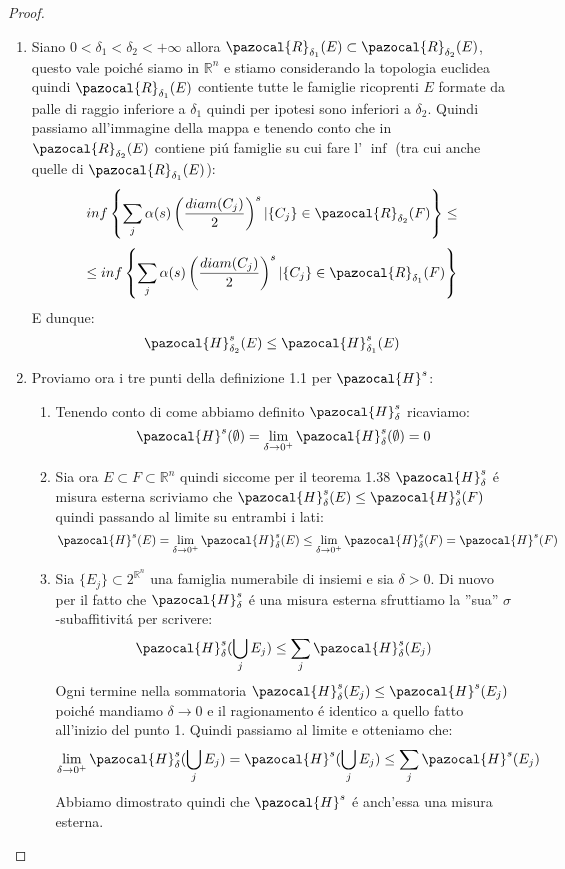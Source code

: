 \documentclass[11pt,a4paper]{report}
\theoremstyle{plain}
\theoremstyle{definition}
\newcommand{\Ha}{\pazocal{H}_\delta}
\newcommand{\Hu}{\pazocal{H}}
\begin{document}
\begin{proof}
	\begin{enumerate}
		\item Siano $0 < \delta_1 < \delta_2 < + \infty$ allora $\pazocal{R}_{\delta_1}(E) \subset \pazocal{R}_{\delta_2}(E)$, questo vale poich\'e siamo in $\mathbb{R}^n$ e stiamo considerando la topologia euclidea quindi $\pazocal{R}_{\delta_1}(E)$ contiente tutte le famiglie ricoprenti $E$ formate da palle di raggio inferiore a $\delta_1$ quindi per ipotesi sono inferiori a $\delta_2$. Quindi passiamo all'immagine della mappa e tenendo conto che in $\pazocal{R}_{\delta_2}(E)$ contiene pi\'u famiglie su cui fare l' $\inf$ (tra cui anche quelle di $\pazocal{R}_{\delta_1}(E)$):
		\[
			inf\left\{\sum\limits_j \alpha(s) \left(\frac{diam(C_j)}{2}\right)^s | \{C_j\} \in  \pazocal{R}_{\delta_2}(F)\right\} \le
		\] 
		\[
			\le inf\left\{\sum\limits_j \alpha(s) \left(\frac{diam(C_j)}{2}\right)^s | \{C_j\} \in  \pazocal{R}_{\delta_1}(F)\right\}		
		\]
		E dunque:
		\[
			\Hu_{\delta_2}^s(E) \le \Hu_{\delta_1}^s(E)	
		\]
		\item Proviamo ora i tre punti della definizione 1.1 per $\Hu^s$:
			\begin{enumerate}
				\item Tenendo conto di come abbiamo definito $\Ha^s$ ricaviamo:
					\[
						\Hu^s(\emptyset) = \lim\limits_{\delta \rightarrow 0^+} \Ha^s(\emptyset) = 0
					\]
					\item Sia ora $E \subset F \subset \mathbb{R}^n$ quindi siccome per il teorema 1.38 $\Ha^s$ \'e misura esterna scriviamo che $\Ha^s(E) \le \Ha^s(F)$ quindi passando al limite su entrambi i lati:
					\[
						\Hu^s(E) = \lim\limits_{\delta \rightarrow 0^+} \Ha^s(E) \le \lim\limits_{\delta \rightarrow 0^+} \Ha^s(F)	= \Hu^s(F)		
					\]
					\item Sia $\{E_j\} \subset 2^{\mathbb{R}^n}$ una famiglia numerabile di insiemi e sia $\delta > 0$. Di nuovo per il fatto che $\Ha^s$ \'e una misura esterna sfruttiamo la ''sua'' $\sigma$-subaffitivit\'a per scrivere:
					\[
						\Ha^s(\bigcup\limits_jE_j) \le \sum\limits_j\Ha^s(E_j)					
					\]
					Ogni termine nella sommatoria $\Ha^s(E_j) \le \Hu^s(E_j)$ poich\'e mandiamo $\delta \rightarrow 0$ e il ragionamento \'e identico a quello fatto all'inizio del punto 1. Quindi passiamo al limite e otteniamo che:
					\[
						\lim\limits_{\delta \rightarrow 0^+}\Ha^s(\bigcup\limits_{j}E_j) = \Hu^s(\bigcup\limits_{j}E_j) \le \sum\limits_j\Hu^s(E_j)
					\]
					Abbiamo dimostrato quindi che $\Hu^s$ \'e anch'essa una misura esterna.

\end{enumerate}
\end{enumerate}
\end{proof}
\end{document}
